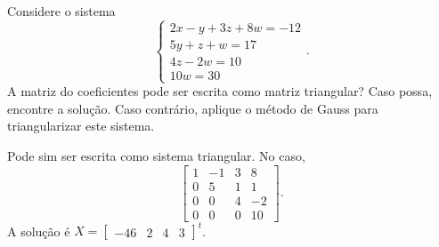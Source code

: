 %
%
%
%
%
%
%
%

%
%
%
%
%
%
%
%





\begin{ex}
Considere o sistema
$$\begin{cases}
2x-y+3z+8w=-12\\
5y+z+w=17\\
4z-2w=10\\
10w=30
\end{cases}.$$
A matriz do coeficientes pode ser escrita como matriz triangular? Caso possa, encontre a solução. Caso contrário, aplique o método de Gauss para triangularizar este sistema.
\begin{sol}
Pode sim ser escrita como sistema triangular. No caso,
$$\begin{bmatrix}
1&-1&3&8\\
0&5&1&1\\
0&0&4&-2\\
0&0&0&10
\end{bmatrix}.$$
A solução é $X=\begin{bmatrix}
-46&2&4&3\end{bmatrix}^t$. 
\end{sol}
\end{ex}


